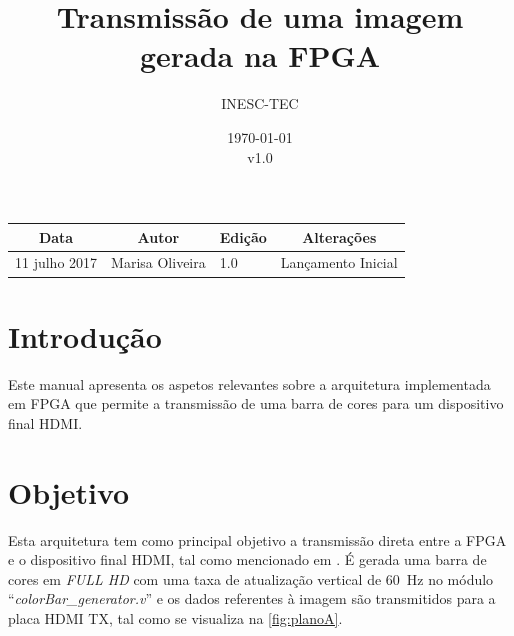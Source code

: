 \documentclass[11pt,a4paper]{article}
\title{Transmissão de uma imagem gerada na FPGA} %
\author{INESC-TEC}
\date{\today \\ v1.0} %
\begin{document}
	
	\maketitle %
	
	\begin{table}[h!]
		\centering
		\label{my-label}
		\begin{tabular}{@{}llll@{}}
			\toprule
			\multicolumn{1}{c}{\textbf{Data}} & \multicolumn{1}{c}{\textbf{Autor}} & \multicolumn{1}{c}{\textbf{Edição}} & \multicolumn{1}{c}{\textbf{Alterações}} \\ \midrule
			11 julho 2017                     & Marisa Oliveira                    & 1.0                                 & Lançamento Inicial                       \\ \bottomrule
		\end{tabular}
	\end{table}
	
	
	
	\section{Introdução}
	
	Este manual apresenta os aspetos relevantes sobre a arquitetura implementada em FPGA que permite a transmissão de uma barra de cores para um dispositivo final HDMI.
	
	\section{Objetivo}
	
	Esta arquitetura tem como principal objetivo a transmissão direta entre a FPGA e o dispositivo final HDMI, tal como mencionado em \cite{R041}. É gerada uma barra de cores em \textit{FULL HD} com uma taxa de atualização vertical de \SI{60}{\hertz} no módulo ``\textit{colorBar\_generator.v}'' e os dados referentes à imagem são transmitidos para a placa HDMI TX, tal como se visualiza na \cref{fig:planoA}.
\end{document}
